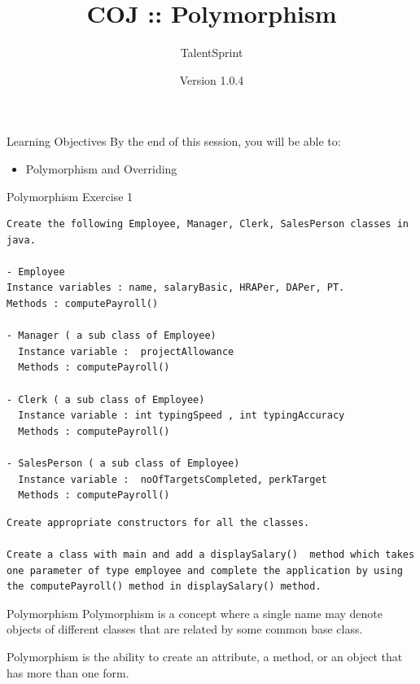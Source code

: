 \documentclass[14pt]{beamer}
\title[COJ:Java:03]{COJ :: Polymorphism}
\author[TS]{TalentSprint}
\institute[L\&D]{Licensed To Skill}
\date{Version 1.0.4}
\begin{document}
\begin{frame}
  \titlepage
\end{frame}

\begin{frame}{Learning Objectives}
By the end of this session, you will be able to:
  \begin{itemize}

  \item Polymorphism and Overriding

  \end{itemize}
\end{frame}

\begin{frame}[fragile]{Polymorphism}
Exercise 1
\begin{lstlisting}[numbers=none, basicstyle=\tiny]
Create the following Employee, Manager, Clerk, SalesPerson classes in java.

- Employee 
Instance variables : name, salaryBasic, HRAPer, DAPer, PT. 
Methods : computePayroll()

- Manager ( a sub class of Employee)
  Instance variable :  projectAllowance 
  Methods : computePayroll()

- Clerk ( a sub class of Employee)
  Instance variable : int typingSpeed , int typingAccuracy
  Methods : computePayroll()

- SalesPerson ( a sub class of Employee)
  Instance variable :  noOfTargetsCompleted, perkTarget
  Methods : computePayroll()
\end{lstlisting}

\begin{lstlisting}[numbers=none, basicstyle=\tiny]
Create appropriate constructors for all the classes.

Create a class with main and add a displaySalary()  method which takes one parameter of type employee and complete the application by using the computePayroll() method in displaySalary() method.
\end{lstlisting}
\end{frame}



\begin{frame}{Polymorphism}
Polymorphism is a concept where a single name may denote objects of different classes that are related by some common base class. 

Polymorphism is the ability to create an attribute, a method, or an object that has more than one form.
\end{frame}
\end{document}
